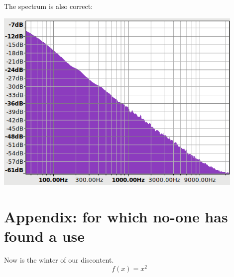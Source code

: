 \documentclass[a4paper,10pt]{article}
\begin{document}
The spectrum is also correct:
\begin{center}
\includegraphics[width=12cm]{brown-freq-audacity.png}
\end{center}
 

\appendix

\section{Appendix: for which no-one has found a use}

Now is the winter of our discontent.
\begin{equation*}
  f(x) = x^2
\end{equation*}
\end{document}
